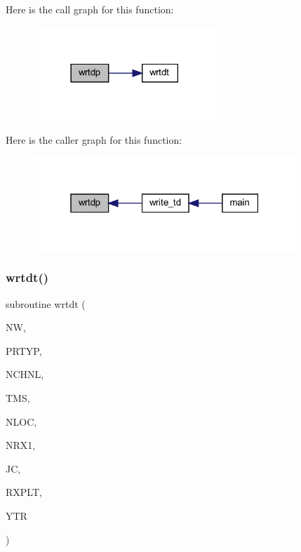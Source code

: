 Here is the call graph for this function\+:
\nopagebreak
\begin{figure}[H]
\begin{center}
\leavevmode
\includegraphics[width=194pt]{Marco_8f90_a071a3c64cc5ab69eb6ca8b8b9371c9f4_cgraph}
\end{center}
\end{figure}
Here is the caller graph for this function\+:
\nopagebreak
\begin{figure}[H]
\begin{center}
\leavevmode
\includegraphics[width=280pt]{Marco_8f90_a071a3c64cc5ab69eb6ca8b8b9371c9f4_icgraph}
\end{center}
\end{figure}
\mbox{\label{Marco_8f90_a39656ce23a727d198891a5951d6ba7c9}} 
\subsubsection{\texorpdfstring{wrtdt()}{wrtdt()}}
{\footnotesize\ttfamily subroutine wrtdt (\begin{DoxyParamCaption}\item[{integer}]{NW,  }\item[{integer}]{P\+R\+T\+YP,  }\item[{integer}]{N\+C\+H\+NL,  }\item[{real, dimension(nchnl)}]{T\+MS,  }\item[{integer}]{N\+L\+OC,  }\item[{integer}]{N\+R\+X1,  }\item[{integer}]{JC,  }\item[{real(kind=8), dimension(3,nloc)}]{R\+X\+P\+LT,  }\item[{real, dimension(nchnl,nloc)}]{Y\+TR }\end{DoxyParamCaption})}

